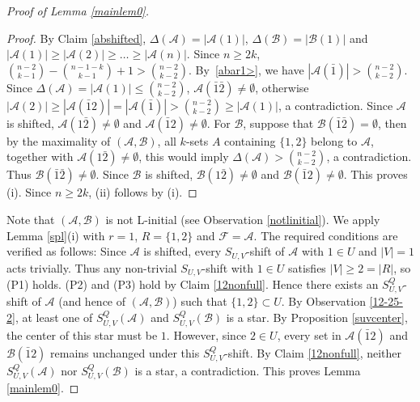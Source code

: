 \documentclass[a4paper,11pt]{article}
\newcommand{\m}{\mathcal}
\begin{document}
\begin{proof}[Proof of Lemma \ref{mainlem0}]
\begin{proof}
By Claim \ref{abshifted}, $\Delta(\mathcal{A})=|\mathcal{A}(1)|$, $\Delta(\mathcal{B})=|\mathcal{B}(1)|$ and $|\mathcal{A}(1)|\ge |\mathcal{A}(2)|\ge \dots \ge |\mathcal{A}(n)|$. 
Since $n\ge 2k$, ${n-2\choose k-1}-{n-1-k\choose k-1}+1>{n-2\choose k-2}$.
By~\eqref{abar1>}, we have  
$|\mathcal{A}(\bar{1})|>{n-2\choose k-2}$.
Since $\Delta(\m A)=|\mathcal{A}(1)|\le {n-2\choose k-2}$, $\mathcal{A}(\bar{1}\bar{2})\ne \emptyset$, otherwise $|\m A(2)|\ge |\m A(\bar12)|=|\m A(\bar1)|>{n-2\choose k-2}\ge |\mathcal{A}(1)|$, a contradiction. 
Since $\m A$ is shifted,  
$\mathcal{A}(1\bar{2})\ne \emptyset$ and $\mathcal{A}(\bar{1}2)\ne \emptyset$.  
For $\m B$, suppose that $\mathcal{B}(\bar{1}\bar{2})= \emptyset$, then by the maximality of $(\mathcal{A}, \mathcal{B})$, all $k$-sets $A$ containing $\{1, 2\}$ belong to $\mathcal{A}$, together with $\mathcal{A}(1\bar{2})\ne \emptyset$, this would imply $\Delta(\mathcal{A})>{n-2\choose k-2}$, a contradiction. Thus $\mathcal{B}(\bar{1}\bar{2})\ne \emptyset$. Since $\m B$ is shifted,  
$\mathcal{B}(1\bar{2})\ne \emptyset$ and $\mathcal{B}(\bar{1}2)\ne \emptyset$.      
This proves (i). Since $n\ge 2k$, (ii) follows by (i). 
\end{proof}

Note that $(\m A, \m B)$ is not L-initial (see Observation \ref{notlinitial}). 
We apply Lemma \ref{spl}(i) with $r=1$, $R=\{1,2\}$ and  $\m F=\m A$. 
The required conditions are verified as follows: Since $\m A$ is shifted, every $S_{U,V}$-shift of $\m A$
with $1\in U$ and $|V|=1$ acts trivially.
Thus any non-trivial $S_{U,V}$-shift with $1\in U$
satisfies $|V|\ge 2=|R|$, so (P1) holds. (P2) and (P3) hold by Claim \ref{12nonfull}. 
Hence there exists an $S^{Q}_{U,V}$-shift of $\m A$
(and hence of $(\m A,\m B)$) such that $\{1,2\}\subset U$.
By Observation \ref{12-25-2}, at least one of $S^{Q}_{U,V}(\m A)$ and $S^{Q}_{U,V}(\m B)$
is a star. 
By Proposition \ref{suvcenter}, the center of this star must be $1$.
However, since $2\in U$,
every set in $\mathcal{A}(\bar{1}2)$ and
$\mathcal{B}(\bar{1}2)$ remains unchanged under this $S_{U,V}^Q$-shift.
By Claim \ref{12nonfull},
neither $S^{Q}_{U,V}(\m A)$ nor
$S^{Q}_{U,V}(\m B)$ is a star, a contradiction.
This proves Lemma \ref{mainlem0}.
\end{proof}
\end{document}
